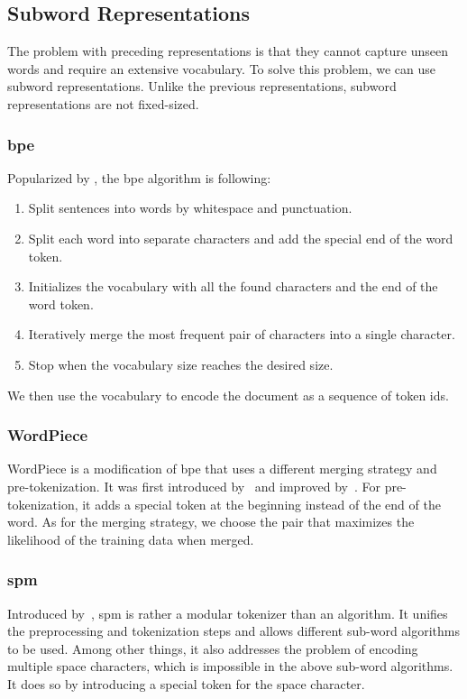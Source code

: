 \subsection{Subword Representations}
The problem with preceding representations is that they cannot capture unseen words and require
an extensive vocabulary. To solve this problem, we can use subword representations. Unlike the previous
representations, subword representations are not fixed-sized.

\subsubsection{\acl{bpe}}
\label{sec:bpe}
Popularized by \textcite{sennrichNeuralMachineTranslation2016b}, the \acf{bpe} algorithm is following:
\begin{enumerate}
    \item Split sentences into words by whitespace and punctuation.
    \item Split each word into separate characters and add the special end of the word token.
    \item Initializes the vocabulary with all the found characters and the end of the word token.
    \item Iteratively merge the most frequent pair of characters into a single character.
    \item Stop when the vocabulary size reaches the desired size.
\end{enumerate}
We then use the vocabulary to encode the document as a sequence of token ids.

\subsubsection{WordPiece}
\label{sec:wordpiece}
WordPiece is a modification of \ac{bpe} that uses a different merging
strategy and pre-tokenization. It was first introduced by~\textcite{schusterJapaneseKoreanVoice2012}
and improved by~\textcite{wuGoogleNeuralMachine2016}.
For pre-tokenization, it adds a special token at the beginning instead of the end of the word.
As for the merging strategy, we choose the pair that maximizes the likelihood of the training data when merged.

\subsubsection{\acl{spm}}
\label{sec:spm}
Introduced by~\textcite{kudoSentencePieceSimpleLanguage2018}, \acf{spm} is rather a modular tokenizer than an algorithm.
It unifies the preprocessing and tokenization steps and allows different sub-word algorithms to be used.
Among other things, it also addresses the problem of encoding multiple space characters, which is impossible in the above sub-word algorithms.
It does so by introducing a special token for the space character.


